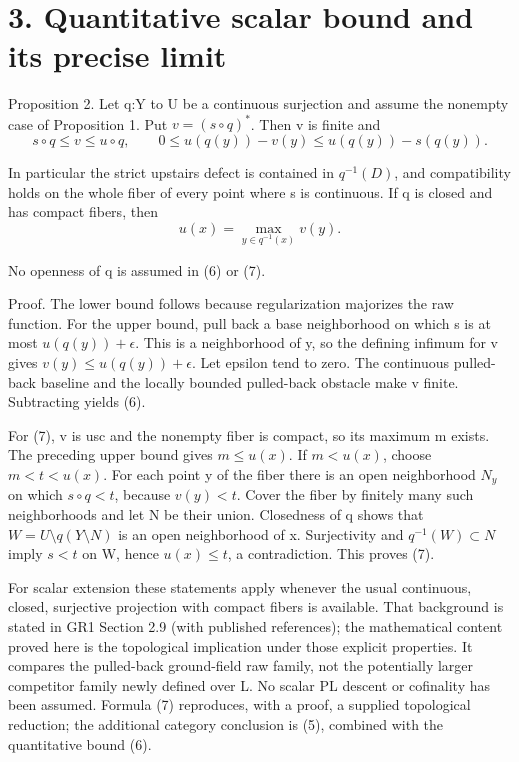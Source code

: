 \documentclass[11pt,a4paper]{article}
\begin{document}
\section*{3. Quantitative scalar bound and its precise limit}

Proposition 2. Let q:Y to U be a continuous surjection and assume the nonempty case of Proposition 1. Put \(v=(s\circ q)^*\). Then v is finite and
\[
s\circ q\leq v\leq u\circ q,\qquad
0\leq u(q(y))-v(y)\leq u(q(y))-s(q(y)).
\tag{6}
\]

In particular the strict upstairs defect is contained in \(q^{-1}(D)\), and compatibility holds on the whole fiber of every point where s is continuous. If q is closed and has compact fibers, then
\[
u(x)=\max_{y\in q^{-1}(x)}v(y).
\tag{7}
\]

No openness of q is assumed in (6) or (7).

Proof. The lower bound follows because regularization majorizes the raw function. For the upper bound, pull back a base neighborhood on which s is at most \(u(q(y))+\epsilon\). This is a neighborhood of y, so the defining infimum for v gives \(v(y)\leq u(q(y))+\epsilon\). Let epsilon tend to zero. The continuous pulled-back baseline and the locally bounded pulled-back obstacle make v finite. Subtracting yields (6).

For (7), v is usc and the nonempty fiber is compact, so its maximum m exists. The preceding upper bound gives \(m\leq u(x)\). If \(m<u(x)\), choose \(m<t<u(x)\). For each point y of the fiber there is an open neighborhood \(N_y\) on which \(s\circ q<t\), because \(v(y)<t\). Cover the fiber by finitely many such neighborhoods and let N be their union. Closedness of q shows that \(W=U\setminus q(Y\setminus N)\) is an open neighborhood of x. Surjectivity and \(q^{-1}(W)\subset N\) imply \(s<t\) on W, hence \(u(x)\leq t\), a contradiction. This proves (7).

For scalar extension these statements apply whenever the usual continuous, closed, surjective projection with compact fibers is available. That background is stated in GR1 Section 2.9 (with published references); the mathematical content proved here is the topological implication under those explicit properties. It compares the pulled-back ground-field raw family, not the potentially larger competitor family newly defined over L. No scalar PL descent or cofinality has been assumed. Formula (7) reproduces, with a proof, a supplied topological reduction; the additional category conclusion is (5), combined with the quantitative bound (6).
\end{document}
